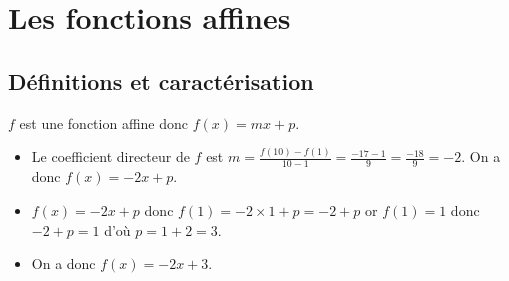 %
%
\section{Les fonctions affines}
%
%
\subsection{Définitions et caractérisation}
%
%
%
\begin{exr}
$f$ est une fonction affine donc $f(x)=mx+p$.
    \begin{itemize}
    \item Le coefficient directeur de $f$ est $m=\frac{f(10)-f(1)}{10-1}=\frac{-17-1}{9}=\frac{-18}{9}=-2$. 
    On a donc $f(x)=-2x+p$.
    \item $f(x)=-2x+p$ donc $f(1)=-2\times1+p=-2+p$ or $f(1)=1$ donc $-2+p=1$ d'où $p=1+2=3$.
    \item On a donc $f(x)=-2x+3$.
    \end{itemize}
\end{exr}
%
%
